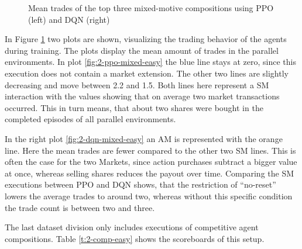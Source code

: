 \begin{figure}[hpbt]
    \centering
    \hspace{0.01\textwidth}
    \caption[Mean Trades of the Top Mixed-Motive Modes in a 5x5 Environment]{Mean trades of the top three mixed-motive compositions using PPO (left) and DQN (right)}
    \label{fig:multipic_plots_mixed_easy} %
\end{figure}

In Figure \ref{fig:multipic_plots_mixed_easy} two plots are shown, visualizing the trading behavior of the agents during training. The plots display the mean amount of trades in the parallel environments. In plot \ref{fig:2-ppo-mixed-easy} the blue line stays at zero, since this execution does not contain a market extension. The other two lines are slightly decreasing and move between 2.2 and 1.5. Both lines here represent a SM interaction with the values showing that on average two market transactions occurred. This in turn means, that about two shares were bought in the completed episodes of all parallel environments.

In the right plot \ref{fig:2-dqn-mixed-easy} an AM is represented with the orange line. Here the mean trades are fewer compared to the other two SM lines. This is often the case for the two Markets, since action purchases subtract a bigger value at once, whereas selling shares reduces the payout over time. Comparing the SM executions between PPO and DQN shows, that the restriction of ``no-reset'' lowers the average trades to around two, whereas without this specific condition the trade count is between two and three.

The last dataset division only includes executions of competitive agent compositions. Table \ref{t:2-comp-easy} shows the scoreboards of this setup.

